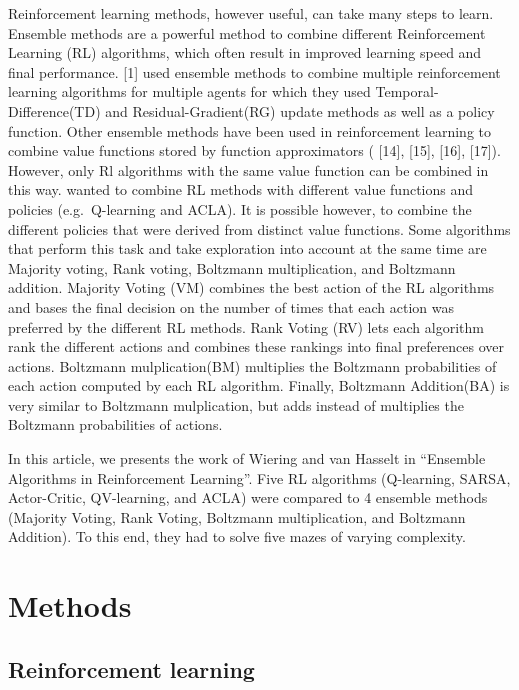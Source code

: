 \documentclass[letterpaper]{article}
\begin{document}
Reinforcement learning methods, however useful, can take many steps to
learn. Ensemble methods are a powerful method to combine different
Reinforcement Learning (RL) algorithms, which often result in improved
learning speed and final performance. {[}1{]} used ensemble methods to
combine multiple reinforcement learning algorithms for multiple agents
for which they used Temporal-Difference(TD) and Residual-Gradient(RG)
update methods as well as a policy function. Other ensemble methods have
been used in reinforcement learning to combine value functions stored by
function approximators (\cite{wiering2008} {[}14{]}, {[}15{]}, {[}16{]},
{[}17{]}). However, only Rl algorithms with the same value function can
be combined in this way. \cite{wiering2008} wanted to combine RL methods with
different value functions and policies (e.g.~Q-learning and ACLA). It is
possible however, to combine the different policies that were derived
from distinct value functions. Some algorithms that perform this task
and take exploration into account at the same time are Majority voting,
Rank voting, Boltzmann multiplication, and Boltzmann addition. Majority
Voting (VM) combines the best action of the RL algorithms and bases the
final decision on the number of times that each action was preferred by
the different RL methods. Rank Voting (RV) lets each algorithm rank the
different actions and combines these rankings into ﬁnal preferences over
actions. Boltzmann mulplication(BM) multiplies the Boltzmann
probabilities of each action computed by each RL algorithm. Finally,
Boltzmann Addition(BA) is very similar to Boltzmann mulplication, but
adds instead of multiplies the Boltzmann probabilities of actions.

In this article, we presents the work of Wiering and van Hasselt in
``Ensemble Algorithms in Reinforcement Learning''. Five RL algorithms
(Q-learning, SARSA, Actor-Critic, QV-learning, and ACLA) were compared
to 4 ensemble methods (Majority Voting, Rank Voting, Boltzmann
multiplication, and Boltzmann Addition). To this end, they had to solve
five mazes of varying complexity.

\section{Methods}\label{methods}

\subsection{Reinforcement learning}\label{reinforcement-learning}
\end{document}
